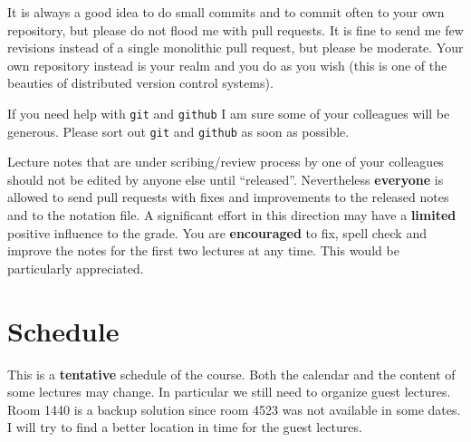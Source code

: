 \documentclass[a4paper,justified]{tufte-handout}
\begin{document}
  It is always a good idea to  do small commits and to commit often to
  your own repository, but please do  not flood me with pull requests.
  It is fine  to send me few revisions instead  of a single monolithic
  pull request, but  please be moderate.  Your  own repository instead
  is your realm and you do as you wish (this is one of the beauties of
  distributed version control systems).

  If you  need help  with \texttt{git} and  \texttt{github} I am  sure some  of your
  colleagues will  be generous. Please  sort out \texttt{git} and  \texttt{github} as
  soon as possible.

  Lecture notes that are under  scribing/review process by one of your
  colleagues should  not be  edited by  anyone else  until “released”.
  Nevertheless \textbf{everyone} is allowed to  send pull requests with fixes
  and improvements to the released notes  and to the notation file.  A
  significant effort in  this direction may have  a \textbf{limited} positive
  influence to  the grade.  You  are \textbf{encouraged} to fix,  spell check
  and improve the  notes for the first two lectures  at any time. This
  would be particularly appreciated.


\pagebreak

\section{Schedule}


  This is a \textbf{tentative} schedule of  the course. Both the calendar and
  the content of some lectures may change. In particular we still need
  to organize  guest lectures.  Room 1440 is  a backup  solution since
  room 4523  was not  available in some  dates. I will  try to  find a
  better location in time for the guest lectures.
\end{document}
